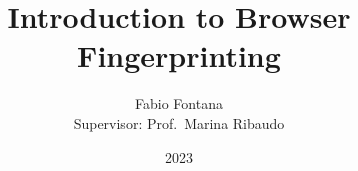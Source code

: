 \documentclass{beamer}
\title{Introduction to Browser Fingerprinting}
\author[Fabio Fontana]{Fabio Fontana \\ {\small Supervisor: Prof.~Marina Ribaudo}}
\institute{University of Genoa}
\date{2023}
\begin{document}
\frame{\titlepage}
\end{document}
